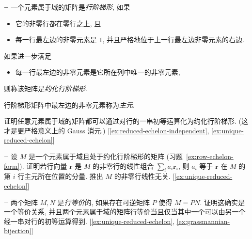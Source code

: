 \begin{prob}
\label{ex:row-echelon-form}
$\neg$ 一个元素属于域的矩阵是\emph{行阶梯形}, 如果
\begin{itemize}
\item 它的非零行都在零行之上, 且
\item 每一行最左边的非零元素是 $1$, 并且严格地位于上一行最左边非零元素的右边.
\end{itemize}
如果进一步满足
\begin{itemize}
\item 每一行最左边的非零元素是它所在列中唯一的非零元素,
\end{itemize}
则称该矩阵是\emph{约化行阶梯形}.

行阶梯形矩阵中最左边的非零元素称为\emph{主元}.

证明任意元素属于域的矩阵都可以通过对行的一串初等运算化为约化行阶梯形. (这才是更严格意义上的 Gauss 消元.) [\ref{ex:reduced-echelon-independent}, \ref{ex:unique-reduced-echelon}]
\end{prob}

\begin{prob}
\label{ex:reduced-echelon-independent}
$\neg$ 设 $M$ 是一个元素属于域且处于约化行阶梯形的矩阵 (习题~\ref{ex:row-echelon-form}). 证明若行向量 $\mathbf{r}$ 是 $M$ 的非零行的线性组合 $\sum_i a_i\mathbf{r}_i$, 则 $a_i$ 等于 $\mathbf{r}$ 在 $M$ 的第 $i$ 行主元所在位置的分量. 推出 $M$ 的非零行线性无关. [\ref{ex:unique-reduced-echelon}]
\end{prob}

\begin{prob}
\label{ex:row-equivalence}
$\neg$ 两个矩阵 $M,N$ 是\emph{行等价}的, 如果存在可逆矩阵 $P$ 使得 $M=PN$. 证明这确实是一个等价关系, 并且两个元素属于域的矩阵行等价当且仅当其中一个可以由另一个经一串对行的初等运算得到. [\ref{ex:unique-reduced-echelon}, \ref{ex:grassmannian-bijection}]
\end{prob}

